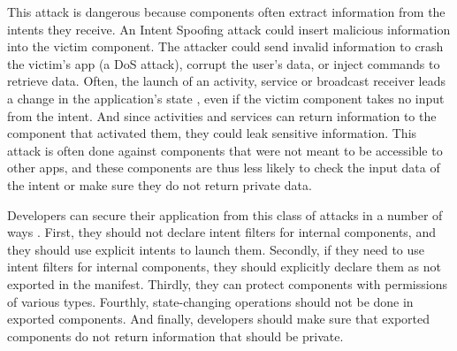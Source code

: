     This attack is dangerous because components often extract information from the intents they receive. An Intent Spoofing attack could insert malicious information into the victim component. The attacker could send invalid information to crash the victim’s app (a DoS attack), corrupt the user’s data, or inject commands to retrieve data. Often, the launch of an activity, service or broadcast receiver leads a change in the application’s state \cite{2010_icc_paper}, even if the victim component takes no input from the intent. And since activities and services can return information to the component that activated them, they could leak sensitive information. This attack is often done against components that were not meant to be accessible to other apps, and these components are thus less likely to check the input data of the intent or make sure they do not return private data.
    
    Developers can secure their application from this class of attacks in a number of ways  \cite{2010_icc_paper}. First, they should not declare intent filters for internal components, and they should use explicit intents to launch them. Secondly, if they need to use intent filters for internal components, they should explicitly declare them as not exported in the manifest. Thirdly, they can protect components with permissions of various types. Fourthly, state-changing operations should not be done in exported components. And finally, developers should make sure that exported components do not return information that should be private.
    